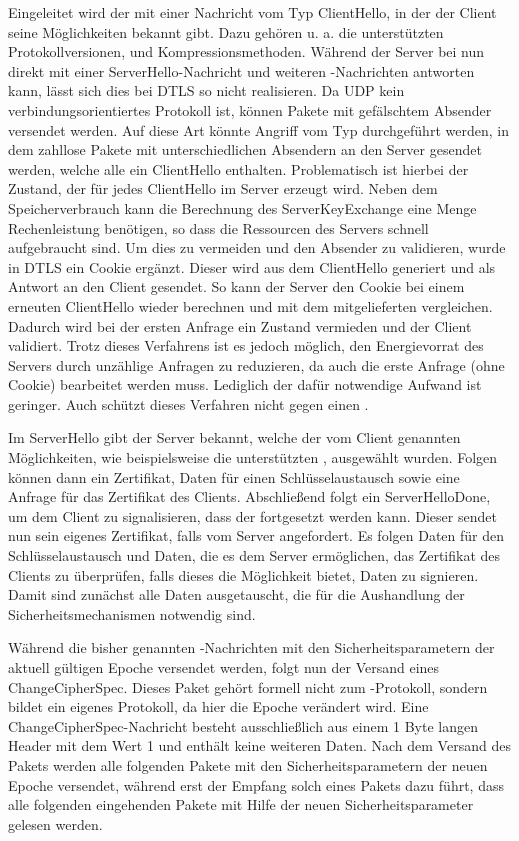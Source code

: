 Eingeleitet wird der  mit einer Nachricht vom Typ ClientHello, in der der Client seine Möglichkeiten bekannt gibt. Dazu gehören u. a. die unterstützten
Protokollversionen,  und Kompressionsmethoden. Während der Server bei  nun direkt mit einer ServerHello-Nachricht und weiteren
-Nachrichten antworten kann, lässt sich dies bei DTLS so nicht realisieren. Da UDP kein verbindungsorientiertes Protokoll ist, können Pakete mit gefälschtem
Absender versendet werden. Auf diese Art könnte Angriff vom Typ  durchgeführt werden, in dem zahllose Pakete mit unterschiedlichen Absendern an den Server
gesendet werden, welche alle ein ClientHello enthalten. Problematisch ist hierbei der Zustand, der für jedes ClientHello im Server erzeugt wird. Neben dem
Speicherverbrauch kann die Berechnung des ServerKeyExchange eine Menge Rechenleistung benötigen, so dass die Ressourcen des Servers schnell aufgebraucht sind.
Um dies zu vermeiden und den Absender zu validieren, wurde in DTLS ein Cookie ergänzt. Dieser wird aus dem ClientHello generiert und als Antwort an den Client
gesendet. So kann der Server den Cookie bei einem erneuten ClientHello wieder berechnen und mit dem mitgelieferten vergleichen. Dadurch wird bei der ersten Anfrage
ein Zustand vermieden und der Client validiert. Trotz dieses Verfahrens ist es jedoch möglich, den Energievorrat des Servers durch unzählige Anfragen zu reduzieren,
da auch die erste Anfrage (ohne Cookie) bearbeitet werden muss. Lediglich der dafür notwendige Aufwand ist geringer. Auch schützt dieses Verfahren nicht gegen
einen .

Im ServerHello gibt der Server bekannt, welche der vom Client genannten Möglichkeiten, wie beispielsweise die unterstützten , ausgewählt wurden.
Folgen können dann ein Zertifikat, Daten für einen Schlüsselaustausch sowie eine Anfrage für das Zertifikat des Clients. Abschließend folgt ein ServerHelloDone, um
dem Client zu signalisieren, dass der  fortgesetzt werden kann. Dieser sendet nun sein eigenes Zertifikat, falls vom Server angefordert. Es folgen Daten
für den Schlüsselaustausch und Daten, die es dem Server ermöglichen, das Zertifikat des Clients zu überprüfen, falls dieses die Möglichkeit bietet, Daten zu signieren.
Damit sind zunächst alle Daten ausgetauscht, die für die Aushandlung der Sicherheitsmechanismen notwendig sind.

Während die bisher genannten -Nachrichten mit den Sicherheitsparametern der aktuell gültigen Epoche versendet werden, folgt nun der Versand eines
ChangeCipherSpec. Dieses Paket gehört formell nicht zum -Protokoll, sondern bildet ein eigenes Protokoll, da hier die Epoche verändert wird.
Eine ChangeCipherSpec-Nachricht besteht ausschließlich aus einem 1 Byte langen Header mit dem Wert 1 und enthält keine weiteren Daten.
Nach dem Versand des Pakets werden alle folgenden Pakete mit den Sicherheitsparametern der neuen Epoche versendet, während erst der Empfang solch eines
Pakets dazu führt, dass alle folgenden eingehenden Pakete mit Hilfe der neuen Sicherheitsparameter gelesen werden.

